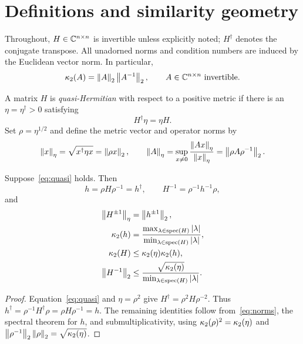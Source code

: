 \section{Definitions and similarity geometry}
Throughout, $H\in\mathbb{C}^{n\times n}$ is invertible unless explicitly noted; $H^\dagger$
denotes the conjugate transpose. All unadorned norms and condition numbers are induced
by the Euclidean vector norm. In particular,
\begin{equation}\label{eq:kappa}
 \kappa_2(A)=\left\lVert A\right\rVert_2\left\lVert A^{-1}\right\rVert_2,
 \qquad A\in\mathbb{C}^{n\times n}\text{ invertible}.
\end{equation}

\begin{definition}
A matrix $H$ is \emph{quasi-Hermitian} with respect to a positive metric if there is an
$\eta=\eta^\dagger>0$ satisfying
\begin{equation}\label{eq:quasi}
 H^\dagger\eta=\eta H.
\end{equation}
Set $\rho=\eta^{1/2}$ and define the metric vector and operator norms by
\begin{equation}\label{eq:norms}
 \left\lVert x\right\rVert_\eta=\sqrt{x^\dagger\eta x}=\left\lVert \rho x\right\rVert_2,
 \qquad \left\lVert A\right\rVert_\eta=\sup_{x\ne 0}\frac{\left\lVert Ax\right\rVert_\eta}{\left\lVert x\right\rVert_\eta}
 =\left\lVert \rho A\rho^{-1}\right\rVert_2.
\end{equation}
\end{definition}

\begin{proposition}\label{prop:similarity}
Suppose~\eqref{eq:quasi} holds. Then
\begin{equation}\label{eq:representative}
 h=\rho H\rho^{-1}=h^\dagger,\qquad
 H^{-1}=\rho^{-1}h^{-1}\rho,
\end{equation}
and
\begin{align}
 \left\lVert H^{\pm1}\right\rVert_\eta&=\left\lVert h^{\pm1}\right\rVert_2,\label{eq:physicalnorm}\\
 \kappa_2(h)&=\frac{\max_{\lambda\in\operatorname{spec}(H)}\left\lvert \lambda\right\rvert}
 {\min_{\lambda\in\operatorname{spec}(H)}\left\lvert \lambda\right\rvert},\label{eq:eigs}\\
 \kappa_2(H)&\leq \kappa_2(\eta)\kappa_2(h),\label{eq:kappabound}\\
 \left\lVert H^{-1}\right\rVert_2&\leq
 \frac{\sqrt{\kappa_2(\eta)}}{\min_{\lambda\in\operatorname{spec}(H)}\left\lvert \lambda\right\rvert}.
 \label{eq:inversebound}
\end{align}
\end{proposition}
\begin{proof}
Equation~\eqref{eq:quasi} and $\eta=\rho^2$ give
$H^\dagger=\rho^2H\rho^{-2}$. Thus
$h^\dagger=\rho^{-1}H^\dagger\rho=\rho H\rho^{-1}=h$.
The remaining identities follow from~\eqref{eq:norms}, the spectral theorem for $h$,
and submultiplicativity, using
$\kappa_2(\rho)^2=\kappa_2(\eta)$ and
$\left\lVert \rho^{-1}\right\rVert_2\left\lVert \rho\right\rVert_2=\sqrt{\kappa_2(\eta)}$.
\end{proof}

